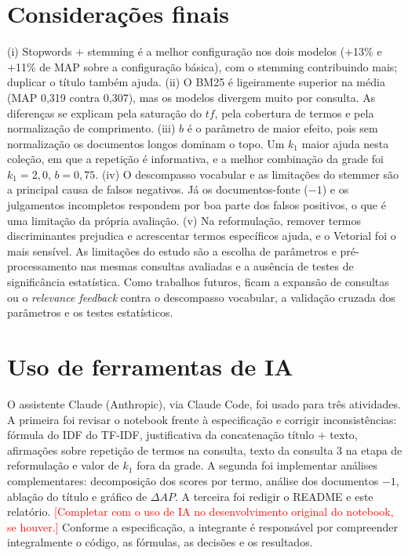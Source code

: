 \documentclass[10pt,a4paper]{article}
\newcommand{\pendente}[1]{\textcolor{red}{#1}}
\newcommand{\term}[1]{\textit{#1}}      %
\begin{document}
\section{Considerações finais}
(i) Stopwords + stemming é a melhor configuração nos dois modelos (+13\% e +11\% de MAP sobre a configuração básica), com o stemming contribuindo mais; duplicar o título também ajuda. (ii) O BM25 é ligeiramente superior na média (MAP 0,319 contra 0,307), mas os modelos divergem muito por consulta. As diferenças se explicam pela saturação do $tf$, pela cobertura de termos e pela normalização de comprimento. (iii) $b$ é o parâmetro de maior efeito, pois sem normalização os documentos longos dominam o topo. Um $k_1$ maior ajuda nesta coleção, em que a repetição é informativa, e a melhor combinação da grade foi $k_1=2{,}0$, $b=0{,}75$. (iv) O descompasso vocabular e as limitações do stemmer são a principal causa de falsos negativos. Já os documentos-fonte ($-1$) e os julgamentos incompletos respondem por boa parte dos falsos positivos, o que é uma limitação da própria avaliação. (v) Na reformulação, remover termos discriminantes prejudica e acrescentar termos específicos ajuda, e o Vetorial foi o mais sensível. As limitações do estudo são a escolha de parâmetros e pré-processamento nas mesmas consultas avaliadas e a ausência de testes de significância estatística. Como trabalhos futuros, ficam a expansão de consultas ou o \term{relevance feedback} contra o descompasso vocabular, a validação cruzada dos parâmetros e os testes estatísticos.

\section{Uso de ferramentas de IA}
O assistente Claude (Anthropic), via Claude Code, foi usado para três atividades. A primeira foi revisar o notebook frente à especificação e corrigir inconsistências: fórmula do IDF do TF-IDF, justificativa da concatenação título + texto, afirmações sobre repetição de termos na consulta, texto da consulta 3 na etapa de reformulação e valor de $k_1$ fora da grade. A segunda foi implementar análises complementares: decomposição dos scores por termo, análise dos documentos $-1$, ablação do título e gráfico de $\Delta AP$. A terceira foi redigir o README e este relatório. \pendente{[Completar com o uso de IA no desenvolvimento original do notebook, se houver.]} Conforme a especificação, a integrante é responsável por compreender integralmente o código, as fórmulas, as decisões e os resultados.
\end{document}
